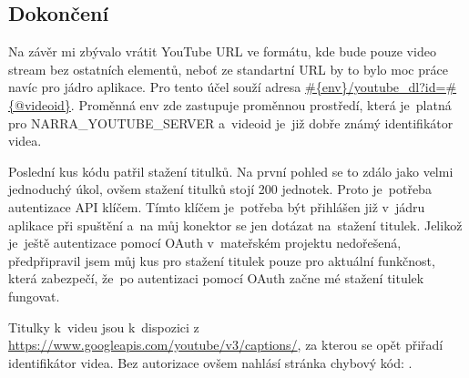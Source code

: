 \subsection{Dokončení}
\par Na závěr mi zbývalo vrátit YouTube URL ve formátu, kde bude pouze video stream bez ostatních elementů, neboť ze standartní URL by to bylo moc práce navíc pro jádro aplikace. Pro tento účel souží adresa \url{#{env}/youtube_dl?id=#{@videoid}}. Proměnná env zde zastupuje proměnnou prostředí, která je~platná pro NARRA\_YOUTUBE\_SERVER a~videoid je~již dobře známý identifikátor videa.
\par Poslední kus kódu patřil stažení titulků. Na první pohled se to zdálo jako velmi jednoduchý úkol, ovšem stažení titulků stojí 200 jednotek. Proto je~potřeba autentizace API klíčem. Tímto klíčem je~potřeba být přihlášen již v~jádru aplikace při spuštění a~na můj konektor se jen dotázat na~stažení titulek. Jelikož je~ještě autentizace pomocí OAuth v~mateřském projektu nedořešená, předpřipravil jsem můj kus pro stažení titulek pouze pro aktuální funkčnost, která zabezpečí, že~po autentizaci pomocí OAuth začne mé stažení titulek fungovat.
\par Titulky k~videu jsou k~dispozici z \url{https://www.googleapis.com/youtube/v3/captions/}, za kterou se opět přiřadí identifikátor videa. Bez autorizace ovšem nahlásí stránka chybový kód: .